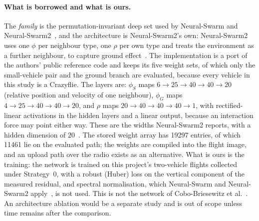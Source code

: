 \paragraph{What is borrowed and what is ours.} The \emph{family} is the permutation-invariant deep
set used by Neural-Swarm and Neural-Swarm2~\cite{shi2020neuralswarm,shi2022neuralswarm2}, and the
architecture is Neural-Swarm2's own: Neural-Swarm2 uses one $\phi$ per neighbour type, one $\rho$
per own type and treats the environment as a further neighbour, to capture ground
effect~\cite{shi2022neuralswarm2}. The implementation is a port of the authors' public reference
code and keeps its five weight sets, of which only the small-vehicle pair and the ground branch are
evaluated, because every vehicle in this study is a Crazyflie. The layers are:
$\phi_S$ maps $6 \rightarrow 25 \rightarrow 40 \rightarrow 40 \rightarrow 20$ (relative position and
velocity of one neighbour), $\phi_G$ maps $4 \rightarrow 25 \rightarrow 40 \rightarrow 40
\rightarrow 20$, and $\rho$ maps $20 \rightarrow 40 \rightarrow 40 \rightarrow 40 \rightarrow 1$,
with rectified-linear activations in the hidden layers and a linear output, because an interaction
force may point either way. These are the widths Neural-Swarm2 reports, with a hidden dimension of
$20$~\cite{shi2022neuralswarm2}. The stored weight array has \num{19297} entries, of which \num{11461}
lie on the evaluated path; the weights are compiled into the flight image, and an upload path over
the radio exists as an alternative. What is ours is the training: the network is trained on this
project's two-vehicle flights collected under Strategy~0, with a robust (Huber) loss on the
vertical component of the measured residual, and spectral normalisation, which Neural-Swarm and
Neural-Swarm2 apply~\cite{shi2020neuralswarm,shi2022neuralswarm2}, is not used. This is not the
network of Cobo-Briesewitz et al.~\cite{cobobriesewitz2026lindi}. An architecture ablation would be
a separate study and is out of scope unless time remains after the comparison.

